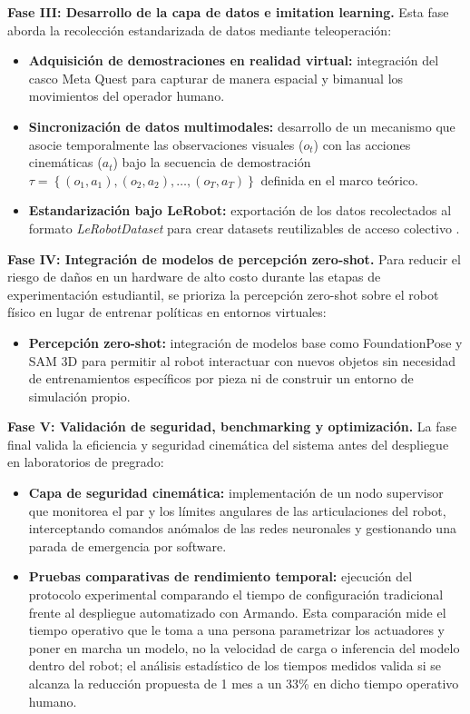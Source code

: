 \documentclass[stu,12pt,floatsintext]{apa7}
\begin{document}
\textbf{Fase III: Desarrollo de la capa de datos e imitation learning.} Esta fase aborda la recolección estandarizada de datos mediante teleoperación:
\begin{itemize}
    \item \textbf{Adquisición de demostraciones en realidad virtual:} integración del casco Meta Quest para capturar de manera espacial y bimanual los movimientos del operador humano.
    \item \textbf{Sincronización de datos multimodales:} desarrollo de un mecanismo que asocie temporalmente las observaciones visuales ($o_t$) con las acciones cinemáticas ($a_t$) bajo la secuencia de demostración $\tau = \left\{(o_1,a_1),(o_2,a_2),\ldots,(o_T,a_T)\right\}$ definida en el marco teórico.
    \item \textbf{Estandarización bajo LeRobot:} exportación de los datos recolectados al formato \textit{LeRobotDataset} para crear datasets reutilizables de acceso colectivo \parencite{cadene2026lerobotopensourcelibraryendtoend}.
\end{itemize}

\textbf{Fase IV: Integración de modelos de percepción zero-shot.} Para reducir el riesgo de daños en un hardware de alto costo durante las etapas de experimentación estudiantil, se prioriza la percepción zero-shot sobre el robot físico en lugar de entrenar políticas en entornos virtuales:
\begin{itemize}
    \item \textbf{Percepción zero-shot:} integración de modelos base como FoundationPose y SAM 3D para permitir al robot interactuar con nuevos objetos sin necesidad de entrenamientos específicos por pieza ni de construir un entorno de simulación propio.
\end{itemize}

\textbf{Fase V: Validación de seguridad, benchmarking y optimización.} La fase final valida la eficiencia y seguridad cinemática del sistema antes del despliegue en laboratorios de pregrado:
\begin{itemize}
    \item \textbf{Capa de seguridad cinemática:} implementación de un nodo supervisor que monitorea el par y los límites angulares de las articulaciones del robot, interceptando comandos anómalos de las redes neuronales y gestionando una parada de emergencia por software.
    \item \textbf{Pruebas comparativas de rendimiento temporal:} ejecución del protocolo experimental comparando el tiempo de configuración tradicional frente al despliegue automatizado con Armando. Esta comparación mide el tiempo operativo que le toma a una persona parametrizar los actuadores y poner en marcha un modelo, no la velocidad de carga o inferencia del modelo dentro del robot; el análisis estadístico de los tiempos medidos valida si se alcanza la reducción propuesta de 1 mes a un 33\% en dicho tiempo operativo humano.
\end{itemize}
\end{document}
